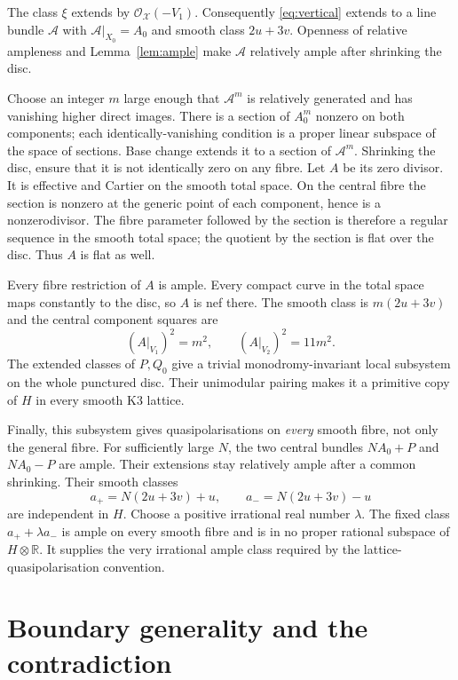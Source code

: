 \documentclass[11pt]{article}
\theoremstyle{definition}
\theoremstyle{remark}
\newcommand{\R}{\mathbb R}
\newcommand{\OO}{\mathcal O}
\begin{document}
The class $\xi$ extends by $\OO_{\mathcal X}(-V_1)$. Consequently \eqref{eq:vertical} extends to a line bundle $\mathscr A$ with $\mathscr A|_{X_0}=A_0$ and smooth class $2u+3v$. Openness of relative ampleness and Lemma~\ref{lem:ample} make $\mathscr A$ relatively ample after shrinking the disc.

Choose an integer $m$ large enough that $\mathscr A^m$ is relatively generated and has vanishing higher direct images. There is a section of $A_0^m$ nonzero on both components; each identically-vanishing condition is a proper linear subspace of the space of sections. Base change extends it to a section of $\mathscr A^m$. Shrinking the disc, ensure that it is not identically zero on any fibre. Let $A$ be its zero divisor. It is effective and Cartier on the smooth total space. On the central fibre the section is nonzero at the generic point of each component, hence is a nonzerodivisor. The fibre parameter followed by the section is therefore a regular sequence in the smooth total space; the quotient by the section is flat over the disc. Thus $A$ is flat as well.

Every fibre restriction of $A$ is ample. Every compact curve in the total space maps constantly to the disc, so $A$ is nef there. The smooth class is $m(2u+3v)$ and the central component squares are
\begin{equation}\label{eq:final-squares}
(A|_{V_1})^2=m^2,\qquad (A|_{V_2})^2=11m^2.
\end{equation}
The extended classes of $P,Q_0$ give a trivial monodromy-invariant local subsystem on the whole punctured disc. Their unimodular pairing makes it a primitive copy of $H$ in every smooth K3 lattice.

Finally, this subsystem gives quasipolarisations on \emph{every} smooth fibre, not only the general fibre. For sufficiently large $N$, the two central bundles $NA_0+P$ and $NA_0-P$ are ample. Their extensions stay relatively ample after a common shrinking. Their smooth classes
\[
a_+=N(2u+3v)+u,\qquad a_-=N(2u+3v)-u
\]
are independent in $H$. Choose a positive irrational real number $\lambda$. The fixed class $a_++\lambda a_-$ is ample on every smooth fibre and is in no proper rational subspace of $H\otimes\R$. It supplies the very irrational ample class required by the lattice-quasipolarisation convention.

\section{Boundary generality and the contradiction}\label{sec:generality}
\end{document}
